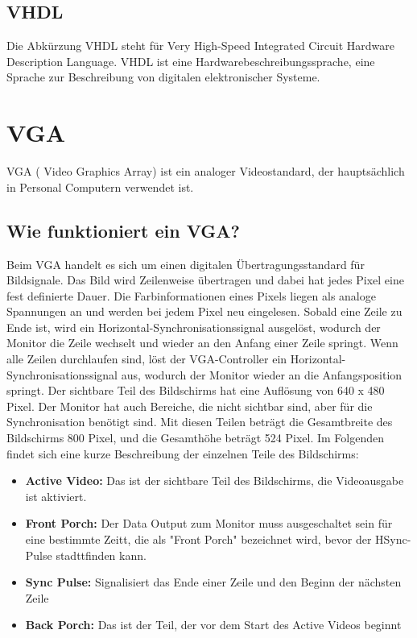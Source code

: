 \documentclass[a4paper, 11pt]{article}
\begin{document}
\subsection{VHDL}

    Die Abkürzung VHDL steht für Very High-Speed Integrated Circuit Hardware Description Language. VHDL ist eine Hardwarebeschreibungssprache, eine Sprache zur Beschreibung von digitalen elektronischer Systeme.
    
\section{VGA}

    VGA ( Video Graphics Array) ist ein analoger Videostandard, der hauptsächlich in Personal Computern verwendet ist.

\subsection{Wie funktioniert ein VGA?}   

    Beim VGA handelt es sich um einen digitalen Übertragungsstandard für Bildsignale. Das Bild wird Zeilenweise übertragen und dabei hat jedes Pixel eine fest definierte Dauer. Die Farbinformationen eines Pixels liegen als analoge Spannungen an und werden bei jedem Pixel neu eingelesen. Sobald eine Zeile zu Ende ist, wird ein Horizontal-Synchronisationssignal ausgelöst, wodurch der Monitor die Zeile wechselt und wieder an den Anfang einer Zeile springt. Wenn alle Zeilen durchlaufen sind, löst der VGA-Controller ein Horizontal-Synchronisationssignal aus, wodurch der Monitor wieder an die Anfangsposition springt.
    Der sichtbare Teil des Bildschirms hat eine Auflösung von 640 x 480 Pixel. Der Monitor hat auch Bereiche, die nicht sichtbar sind, aber für die Synchronisation benötigt sind. Mit diesen Teilen beträgt die Gesamtbreite des Bildschirms 800 Pixel, und die Gesamthöhe beträgt 524 Pixel. Im Folgenden findet sich eine kurze Beschreibung der einzelnen Teile des Bildschirms:
    \begin{itemize}
        \item \textbf{Active Video:} Das ist der sichtbare Teil des Bildschirms, die Videoausgabe ist aktiviert.
        \item \textbf{Front Porch:} Der Data Output zum Monitor muss ausgeschaltet sein für eine bestimmte Zeitt, die als "Front Porch" bezeichnet wird, bevor der HSync-Pulse stadttfinden kann.
        \item \textbf{Sync Pulse:} Signalisiert das Ende einer Zeile und den Beginn der nächsten Zeile
        \item \textbf{Back Porch:} Das ist der Teil, der vor dem Start des Active Videos beginnt
    \end{itemize}
\end{document}
